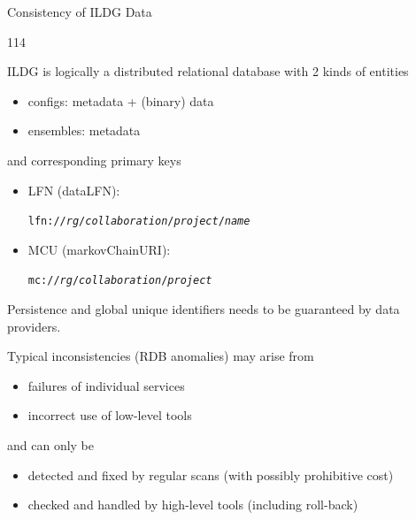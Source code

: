\documentclass[aspectratio=169,xcolor=dvipsnames]{beamer}
\newcommand{\bi}{\begin{itemize}}
\newcommand{\ei}{\end{itemize}}
\begin{document}
\begin{frame}{Consistency of ILDG Data}
  \begin{dinglist}{114}
    \item ILDG is logically a distributed relational database with 2 kinds of entities
      \bi
    \item configs: metadata + (binary) data
    \item ensembles: metadata
    \ei
    and corresponding primary keys
    \bi
    \item \parbox{12em}{LFN (dataLFN):} \alert{\tt lfn://{\it rg}/{\it collaboration}/{\it project}/{\it name}}
    \item \parbox{12em}{MCU (markovChainURI):} \alert{\tt mc://{\it rg}/{\it collaboration}/{\it project}}
    \ei

  \item[\ding{42}] Persistence and global unique identifiers needs to be guaranteed by data providers.
  
  \item Typical inconsistencies (RDB anomalies) may arise from
  \bi
  \item failures of individual services
  \item incorrect use of low-level tools
  \ei
  and can only be
  \bi
  \item detected and fixed by regular scans (with possibly prohibitive cost)
  \item checked and handled by high-level tools (including roll-back)
  \ei
  \end{dinglist}
  \vfill
\end{frame}
\end{document}
